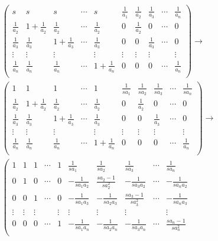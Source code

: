 \documentclass[../../main.tex]{subfiles}
\begin{document}
\begin{solution}
\begin{gather*}
\left( \begin{matrix}
s&		s&		s&		\cdots&		s&		\frac{1}{a_1}&		\frac{1}{a_2}&		\frac{1}{a_3}&		\cdots&		\frac{1}{a_n}\\
\frac{1}{a_2}&		1+\frac{1}{a_2}&		\frac{1}{a_2}&		\cdots&		\frac{1}{a_2}&		0&		\frac{1}{a_2}&		0&		\cdots&		0\\
\frac{1}{a_3}&		\frac{1}{a_3}&		1+\frac{1}{a_3}&		\cdots&		\frac{1}{a_3}&		0&		0&		\frac{1}{a_3}&		\cdots&		0\\
\vdots&		\vdots&		\vdots&		&		\vdots&		\vdots&		\vdots&		\vdots&		&		\vdots\\
\frac{1}{a_n}&		\frac{1}{a_n}&		\frac{1}{a_n}&		\cdots&		1+\frac{1}{a_n}&		0&		0&		0&		\cdots&		\frac{1}{a_n}\\
\end{matrix} \right) \rightarrow 
\\
\left( \begin{matrix}
1&		1&		1&		\cdots&		1&		\frac{1}{sa_1}&		\frac{1}{sa_2}&		\frac{1}{sa_3}&		\cdots&		\frac{1}{sa_n}\\
\frac{1}{a_2}&		1+\frac{1}{a_2}&		\frac{1}{a_2}&		\cdots&		\frac{1}{a_2}&		0&		\frac{1}{a_2}&		0&		\cdots&		0\\
\frac{1}{a_3}&		\frac{1}{a_3}&		1+\frac{1}{a_3}&		\cdots&		\frac{1}{a_3}&		0&		0&		\frac{1}{a_3}&		\cdots&		0\\
\vdots&		\vdots&		\vdots&		&		\vdots&		\vdots&		\vdots&		\vdots&		&		\vdots\\
\frac{1}{a_n}&		\frac{1}{a_n}&		\frac{1}{a_n}&		\cdots&		1+\frac{1}{a_n}&		0&		0&		0&		\cdots&		\frac{1}{a_n}\\
\end{matrix} \right) \rightarrow 
\\
\left( \begin{matrix}
1&		1&		1&		\cdots&		1&		\frac{1}{sa_1}&		\frac{1}{sa_2}&		\frac{1}{sa_3}&		\cdots&		\frac{1}{sa_n}\\
0&		1&		0&		\cdots&		0&		-\frac{1}{sa_1a_2}&		\frac{sa_2-1}{sa_{2}^{2}}&		-\frac{1}{sa_3a_2}&		\cdots&		-\frac{1}{sa_na_2}\\
0&		0&		1&		\cdots&		0&		-\frac{1}{sa_1a_3}&		-\frac{1}{sa_2a_3}&		\frac{sa_3-1}{sa_{3}^{2}}&		\cdots&		-\frac{1}{sa_na_3}\\
\vdots&		\vdots&		\vdots&		&		\vdots&		\vdots&		\vdots&		\vdots&		&		\vdots\\
0&		0&		0&		\cdots&		1&		-\frac{1}{sa_1a_n}&		-\frac{1}{sa_2a_n}&		-\frac{1}{sa_3a_n}&		\cdots&		\frac{sa_n-1}{sa_{n}^{2}}\\

\end{matrix}
\end{gather*}
\end{solution}
\end{document}

